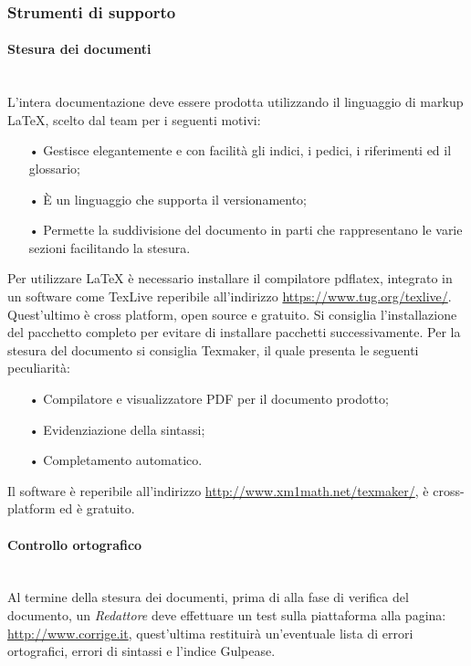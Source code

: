 \subsubsection{Strumenti di supporto} 

\paragraph{Stesura dei documenti}\mbox{}\\
L'intera documentazione deve essere prodotta utilizzando il {linguaggio di markup} \LaTeX{}, scelto dal team per i seguenti motivi:
\begin{itemize}
\item[•] Gestisce elegantemente e con facilità gli indici, i pedici, i riferimenti ed il glossario;
\item[•] È un linguaggio che supporta il {versionamento};
\item[•] Permette la suddivisione del documento in parti che rappresentano le varie sezioni facilitando la stesura.
\end{itemize}
Per utilizzare \LaTeX{} è necessario installare il compilatore pdflatex, integrato in un software come TexLive reperibile all'indirizzo \url{https://www.tug.org/texlive/}. Quest'ultimo è {cross platform}, {open source} e gratuito. Si consiglia l'installazione del pacchetto completo per evitare di installare pacchetti successivamente.
Per la stesura del documento si consiglia Texmaker, il quale presenta le seguenti peculiarità:
\begin{itemize}
	\item[•] Compilatore e visualizzatore {PDF} per il documento prodotto;
	\item[•] Evidenziazione della sintassi;
	\item[•] Completamento automatico.
\end{itemize}  
Il software è reperibile all'indirizzo \url{http://www.xm1math.net/texmaker/}, è cross-platform ed è gratuito.

\paragraph{Controllo ortografico}\mbox{}\\
Al termine della stesura dei documenti, prima di alla fase di verifica del documento, un \textit{Redattore} deve effettuare un test sulla piattaforma alla pagina: \url{ http://www.corrige.it}, quest’ultima restituirà un’eventuale lista di errori ortografici, errori di sintassi e l’indice {Gulpease}.

